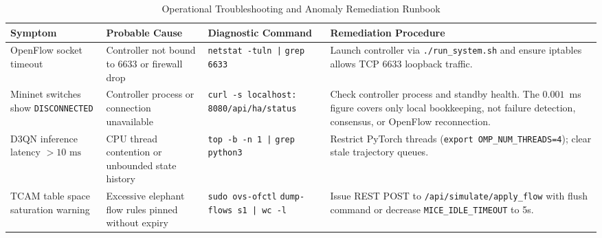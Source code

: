 \documentclass[12pt,a4paper,oneside]{report}
\begin{document}
\begin{table}[H]
\centering
\caption{Operational Troubleshooting and Anomaly Remediation Runbook}
\label{tab:troubleshooting_guide}
\small
\begin{tabularx}{\textwidth}{p{2.8cm} p{2.8cm} p{3.8cm} X}
\toprule
\textbf{Symptom} & \textbf{Probable Cause} & \textbf{Diagnostic Command} & \textbf{Remediation Procedure} \\
\midrule
OpenFlow socket timeout & Controller not bound to 6633 or firewall drop & \texttt{netstat -tuln |} \newline \texttt{grep 6633} & Launch controller via \texttt{./run\_system.sh} and ensure iptables allows TCP 6633 loopback traffic. \\
\addlinespace
Mininet switches show \texttt{DISCONNECTED} & Controller process or connection unavailable & \texttt{curl -s localhost:} \newline \texttt{8080/api/ha/status} & Check controller process and standby health. The $0.001$~ms figure covers only local bookkeeping, not failure detection, consensus, or OpenFlow reconnection. \\
\addlinespace
D3QN inference latency $>10\text{ ms}$ & CPU thread contention or unbounded state history & \texttt{top -b -n 1 |} \newline \texttt{grep python3} & Restrict PyTorch threads (\texttt{export OMP\_NUM\_THREADS=4}); clear stale trajectory queues. \\
\addlinespace
TCAM table space saturation warning & Excessive elephant flow rules pinned without expiry & \texttt{sudo ovs-ofctl} \newline \texttt{dump-flows s1 | wc -l} & Issue REST POST to \texttt{/api/simulate/apply\_flow} with flush command or decrease \texttt{MICE\_IDLE\_TIMEOUT} to 5s. \\
\bottomrule
\end{tabularx}
\end{table}
\end{document}
